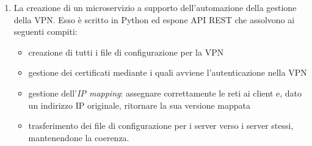 \documentclass[10pt,a4paper]{article}
\begin{document}
\begin{enumerate}
            \item La creazione di un microservizio a supporto dell'automazione
            della gestione della VPN. Esso è scritto in Python ed espone API REST che
            assolvono ai seguenti compiti:
            \begin{itemize}
                \item creazione di tutti i file di configurazione per la VPN
                \item gestione dei certificati mediante i quali avviene l'autenticazione
                nella VPN
                \item gestione dell'\textit{IP mapping}: assegnare correttamente le reti
                ai client e, dato un indirizzo IP originale, ritornare la sua versione mappata
                \item trasferimento dei file di configurazione per i server verso i server stessi,
                mantenendone la coerenza.
            \end{itemize}
        \end{enumerate}

        
\end{document}
